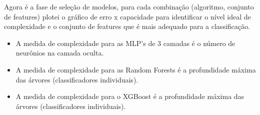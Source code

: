 \documentclass[11pt]{article}
\providecommand{\tightlist}{%
      \setlength{\itemsep}{0pt}\setlength{\parskip}{0pt}}
\begin{document}
    Agora é a fase de seleção de modelos, para cada combinação (algoritmo,
conjunto de features) plotei o gráfico de erro x capacidade para
identificar o nível ideal de complexidade e o conjunto de features que é
mais adequado para a classificação.

\begin{itemize}
\tightlist
\item
  A medida de complexidade para as MLP's de 3 camadas é o número de
  neurônios na camada oculta.
\item
  A medida de complexidade para as Random Forests é a profundidade
  máxima das árvores (classificadores individuais).
\item
  A medida de complexidade para o XGBoost é a profundidade máxima das
  árvores (classificadores individuais).
\end{itemize}
\end{document}
